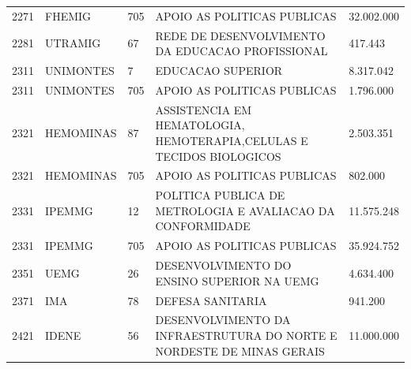 \documentclass{article}
\begin{document}
\begin{longtable}[c]{m{1cm}|m{1.5cm}|m{1cm}m{10cm}|m{2cm}}
\multicolumn{1}{C{1cm}|}{2271} & \multicolumn{1}{L{1.5cm}|}{FHEMIG} & \multicolumn{1}{C{1cm}|}{705} & \multicolumn{1}{L{10cm}|}{APOIO AS POLITICAS PUBLICAS} & \multicolumn{1}{R{2cm}}{32.002.000} \\
\multicolumn{1}{C{1cm}|}{2281} & \multicolumn{1}{L{1.5cm}|}{UTRAMIG} & \multicolumn{1}{C{1cm}|}{67} & \multicolumn{1}{L{10cm}|}{REDE DE DESENVOLVIMENTO DA EDUCACAO PROFISSIONAL} & \multicolumn{1}{R{2cm}}{417.443} \\
\multicolumn{1}{C{1cm}|}{2311} & \multicolumn{1}{L{1.5cm}|}{UNIMONTES} & \multicolumn{1}{C{1cm}|}{7} & \multicolumn{1}{L{10cm}|}{EDUCACAO SUPERIOR} & \multicolumn{1}{R{2cm}}{8.317.042} \\
\multicolumn{1}{C{1cm}|}{2311} & \multicolumn{1}{L{1.5cm}|}{UNIMONTES} & \multicolumn{1}{C{1cm}|}{705} & \multicolumn{1}{L{10cm}|}{APOIO AS POLITICAS PUBLICAS} & \multicolumn{1}{R{2cm}}{1.796.000} \\
\multicolumn{1}{C{1cm}|}{2321} & \multicolumn{1}{L{1.5cm}|}{HEMOMINAS} & \multicolumn{1}{C{1cm}|}{87} & \multicolumn{1}{L{10cm}|}{ASSISTENCIA EM HEMATOLOGIA, HEMOTERAPIA,CELULAS E TECIDOS BIOLOGICOS} & \multicolumn{1}{R{2cm}}{2.503.351} \\
\multicolumn{1}{C{1cm}|}{2321} & \multicolumn{1}{L{1.5cm}|}{HEMOMINAS} & \multicolumn{1}{C{1cm}|}{705} & \multicolumn{1}{L{10cm}|}{APOIO AS POLITICAS PUBLICAS} & \multicolumn{1}{R{2cm}}{802.000} \\
\multicolumn{1}{C{1cm}|}{2331} & \multicolumn{1}{L{1.5cm}|}{IPEMMG} & \multicolumn{1}{C{1cm}|}{12} & \multicolumn{1}{L{10cm}|}{POLITICA PUBLICA DE METROLOGIA E AVALIACAO DA CONFORMIDADE} & \multicolumn{1}{R{2cm}}{11.575.248} \\
\multicolumn{1}{C{1cm}|}{2331} & \multicolumn{1}{L{1.5cm}|}{IPEMMG} & \multicolumn{1}{C{1cm}|}{705} & \multicolumn{1}{L{10cm}|}{APOIO AS POLITICAS PUBLICAS} & \multicolumn{1}{R{2cm}}{35.924.752} \\
\multicolumn{1}{C{1cm}|}{2351} & \multicolumn{1}{L{1.5cm}|}{UEMG} & \multicolumn{1}{C{1cm}|}{26} & \multicolumn{1}{L{10cm}|}{DESENVOLVIMENTO DO ENSINO SUPERIOR NA UEMG} & \multicolumn{1}{R{2cm}}{4.634.400} \\
\multicolumn{1}{C{1cm}|}{2371} & \multicolumn{1}{L{1.5cm}|}{IMA} & \multicolumn{1}{C{1cm}|}{78} & \multicolumn{1}{L{10cm}|}{DEFESA SANITARIA} & \multicolumn{1}{R{2cm}}{941.200} \\
\multicolumn{1}{C{1cm}|}{2421} & \multicolumn{1}{L{1.5cm}|}{IDENE} & \multicolumn{1}{C{1cm}|}{56} & \multicolumn{1}{L{10cm}|}{DESENVOLVIMENTO DA INFRAESTRUTURA DO NORTE E NORDESTE DE MINAS GERAIS} & \multicolumn{1}{R{2cm}}{11.000.000} \\

\end{longtable}
\end{document}
